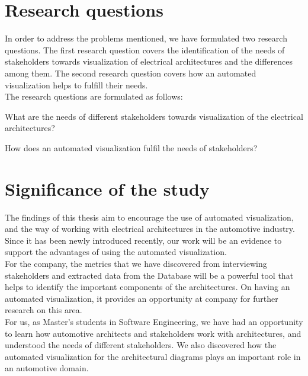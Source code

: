 \section{Research questions} \label{IN:rq}
In order to address the problems mentioned, we have formulated two research questions. The first research question covers the identification of the needs of stakeholders towards visualization of electrical architectures and the differences among them. The second research question covers how an automated visualization helps to fulfill their needs.\\

The research questions are formulated as follows:
\vspace{0.5cm}
\begin{que} \label{que:1}
What are the needs of different stakeholders towards visualization of the electrical architectures?
\end{que}

\begin{que} \label{que:2}
How does an automated visualization fulfil the needs of stakeholders?
\end{que}


\section{Significance of the study} \label{Significance_ref}
The findings of this thesis aim to encourage the use of automated visualization, and the way of working with electrical architectures in the automotive industry. Since it has been newly introduced recently, our work will be an evidence to support the advantages of using the automated visualization. \\

For the company, the metrics that we have discovered from interviewing stakeholders and extracted data from the Database will be a powerful tool that helps to identify the important components of the architectures. On having an automated visualization, it provides an opportunity at company for further research on this area. \\

For us, as Master’s students in Software Engineering, we have had an opportunity to learn how automotive architects and stakeholders work with architectures, and understood the needs of different stakeholders. We also discovered how the automated visualization for the architectural diagrams plays an important role in an automotive domain. 


